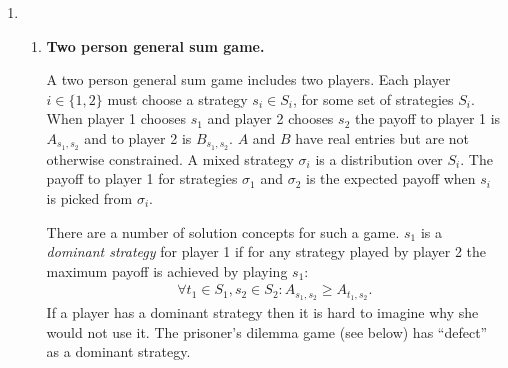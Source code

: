 \documentclass[11pt]{article} \usepackage{amssymb}
\newtheorem*{theorem*}{Theorem}
\begin{document}
\begin{enumerate}
\begin{enumerate}
\begin{enumerate}
\begin{proof}
        Let $V$ be player 1's expected payoff at this Nash. Then,
        since $G$ is a zero sum game then player 2's expected payoff
        is $-V$. Since $(S_1,S_2)$ is a Nash equilibrium then the
        expected payoff for player 1 when playing any other strategy
        is at most $V$, and the same holds for player 2 and $-V$. Thus
        $V$, $S_1$ and $S_2$ satisfy the requirements of the theorem.
      \end{proof}
    \item 
      \begin{theorem*}
        Let $G$ be a zero sum two player game with payoffs $a_{ij}$
        for strategies $1 \leq i \leq n$ and $1 \leq j \leq m$. Then
        \begin{align*}
          \max_{1 \leq i \leq n}\left\{\min_{1 \leq j \leq m}
              a_{ij}\right\}
          \leq \min_{1 \leq j \leq m}\left\{\max_{1 \leq i \leq n} a_{ij}\right\}
        \end{align*}
      \end{theorem*}
      \begin{proof}
        Denote $x_i= \min_{1 \leq j \leq m} a_{ij}$ and $y_j = \max_{1
          \leq i \leq n} a_{ij}$. For any $i$ and $j$ it holds that
        $x_i \leq a_{ij} \leq y_i$, by definition. Hence $\forall i,j$
        it holds that $x_i \leq y_j$, and in particular $\max_ix_i
        \leq min_jy_j$, which is an equivalent statement to that of
        the theorem.        
      \end{proof}
    \end{enumerate}
  \end{enumerate}
\item
  \begin{enumerate}
  \item
   {\bf Two person general sum game.}

      A two person general sum game includes two players. Each player
      $i \in \{1,2\}$ must choose a strategy $s_i \in S_i$, for some
      set of strategies $S_i$. When player 1 chooses $s_1$ and player
      2 chooses $s_2$ the payoff to player 1 is $A_{s_1,s_2}$ and to
      player 2 is $B_{s_1,s_2}$.  $A$ and $B$ have real entries but
      are not otherwise constrained. A mixed strategy $\sigma_i$ is a
      distribution over $S_i$. The payoff to player 1 for strategies
      $\sigma_1$ and $\sigma_2$ is the expected payoff when $s_i$ is
      picked from $\sigma_i$.

      There are a number of solution concepts for such a game. $s_1$
      is a {\em dominant strategy} for player 1 if for any strategy
      played by player 2 the maximum payoff is achieved by playing
      $s_1$:
      \begin{align*}        
        \forall t_1 \in S_1,s_2 \in S_2: A_{s_1,s_2} \geq A_{t_1,s_2}.
      \end{align*}
      If a player has a dominant strategy then it is hard to imagine
      why she would not use it. The prisoner's dilemma game (see
      below) has ``defect'' as a dominant strategy.


\end{enumerate}
\end{enumerate}
\end{document}
